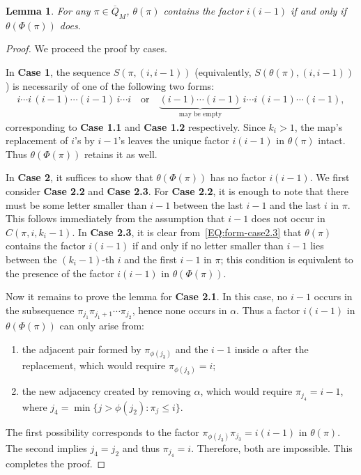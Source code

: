 \documentclass[11pt]{article}
\numberwithin{equation}{section}
\newtheorem{lem}[thm]{Lemma}
\def\oQ{\overline{Q}}
\begin{document}
\begin{lem}\label{LEM:factor-keep}
	For any $\pi\in\oQ_M$, $\theta(\pi)$ contains the factor $i(i-1)$ if and only if $\theta(\Phi(\pi))$ does.
\end{lem}
\begin{proof}
	We proceed the proof by cases.
	
	In \textbf{Case 1}, the sequence $S(\pi,(i,i-1))$ (equivalently, $S(\theta(\pi),(i,i-1))$) is necessarily of one of the following two forms:
	\begin{align*}%
	i\cdots i\,(i-1)\cdots(i-1)\,i\cdots i
	\quad\text{or}\quad
	\underbrace{(i-1)\cdots(i-1)}_{\text{may be empty}}\,i\cdots i\,(i-1)\cdots(i-1),
	\end{align*}
	corresponding to {\bf Case 1.1} and {\bf Case 1.2} respectively. Since $k_i>1$, the map's replacement of $i$'s by $i-1$'s leaves the unique factor $i(i-1)$ in $\theta(\pi)$ intact. Thus $\theta(\Phi(\pi))$ retains it as well.
	
	In \textbf{Case 2}, it suffices to show that $\theta(\Phi(\pi))$ has no factor $i(i-1)$. We first consider \textbf{Case 2.2} and \textbf{Case 2.3}. For \textbf{Case 2.2}, it is enough to note that there must be some letter smaller than $i-1$ between the last $i-1$ and the last $i$ in $\pi$. This follows immediately from the assumption that $i-1$ does not occur in $C(\pi,i,k_i-1)$. In \textbf{Case 2.3}, it is clear from~\eqref{EQ:form-case2.3} that $\theta(\pi)$ contains the factor $i(i-1)$ if and only if no letter smaller than $i-1$ lies between the $(k_i-1)$-th $i$ and the first $i-1$ in $\pi$; this condition is equivalent to the presence of the factor $i(i-1)$ in $\theta(\Phi(\pi))$.
	
	Now it remains to prove the lemma for \textbf{Case 2.1}. In this case, no $i-1$ occurs in the subsequence $\pi_{j_1}\pi_{j_1+1}\cdots\pi_{j_2}$, hence none occurs in $\alpha$. Thus a factor $i(i-1)$ in $\theta(\Phi(\pi))$ can only arise from:
	\begin{enumerate}
		\item the adjacent pair formed by $\pi_{\phi(j_3)}$ and the $i-1$ inside $\alpha$ after the replacement, which would require $\pi_{\phi(j_3)}=i$;
		\item the new adjacency created by removing $\alpha$, which would require $\pi_{j_4}=i-1$, where $j_4=\min\{j>\phi(j_2): \pi_j\le i\}$.
	\end{enumerate}
	The first possibility corresponds to the factor $\pi_{\phi(j_3)}\pi_{j_3}=i(i-1)$ in $\theta(\pi)$. The second implies $j_4=j_2$ and thus $\pi_{j_4}=i$. Therefore, both are impossible. This completes the proof.
\end{proof}
\end{document}

